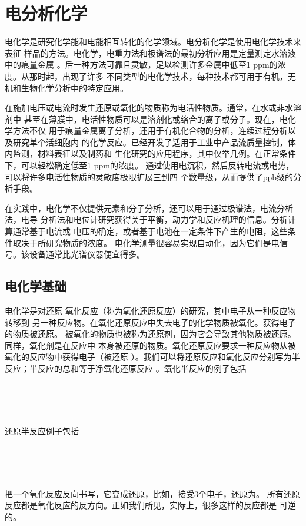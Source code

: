 \chapter{电分析化学}

电化学是研究化学能和电能相互转化的化学领域。电分析化学是使用电化学技术来表征
样品的方法。电化学，电重力法和极谱法的最初分析应用是定量测定水溶液中的痕量金属
。后一种方法可靠且灵敏，足以检测许多金属中低至1 ppm的浓度。从那时起，出现了许多
不同类型的电化学技术，每种技术都可用于有机，无机和生物化学分析中的特定应用。

在施加电压或电流时发生还原或氧化的物质称为电活性物质。通常，在水或非水溶剂中
甚至在薄膜中，电活性物质可以是溶剂化或络合的离子或分子。现在，电化学方法不仅
用于痕量金属离子分析，还用于有机化合物的分析，连续过程分析以及研究单个活细胞内
的化学反应。已经开发了适用于工业中产品流质量控制，体内监测，材料表征以及制药和
生化研究的应用程序，其中仅举几例。在正常条件下，可以轻松确定低至1 ppm的浓度。
通过使用电沉积，然后反转电流或电势，可以将许多电活性物质的灵敏度极限扩展三到四
个数量级，从而提供了ppb级的分析手段。

在实践中，电化学不仅提供元素和分子分析，还可以用于通过极谱法，电流分析法，电导
分析法和电位计研究获得关于平衡，动力学和反应机理的信息。分析计算通常基于电流或
电压的确定，或者基于电池在一定条件下产生的电阻，这些条件取决于所研究物质的浓度。
电化学测量很容易实现自动化，因为它们是电信号。该设备通常比光谱仪器便宜得多。
\section{电化学基础}
电化学是对还原-氧化反应（称为氧化还原反应）的研究，其中电子从一种反应物转移到
另一种反应物。在氧化还原反应中失去电子的化学物质被氧化。获得电子的物质被还原。
被氧化的物质也被称为还原剂，因为它会导致其他物质被还原。同样，氧化剂是在反应中
本身被还原的物质。氧化还原反应要求一种反应物从被氧化的反应物中获得电子（被还原
）。我们可以将还原反应和氧化反应分别写为半反应；半反应的总和等于净氧化还原反应
。氧化半反应的例子包括
\begin{center}
    \\
    \\
    \\
\end{center}
还原半反应例子包括
\begin{center}
    \\
    \\
    \\
\end{center}
把一个氧化反应反向书写，它变成还原，比如，接受3个电子，还原为。
所有还原反应都是氧化反应的反方向。正如我们所见，实际上，很多这样的反应都是
可逆的。

